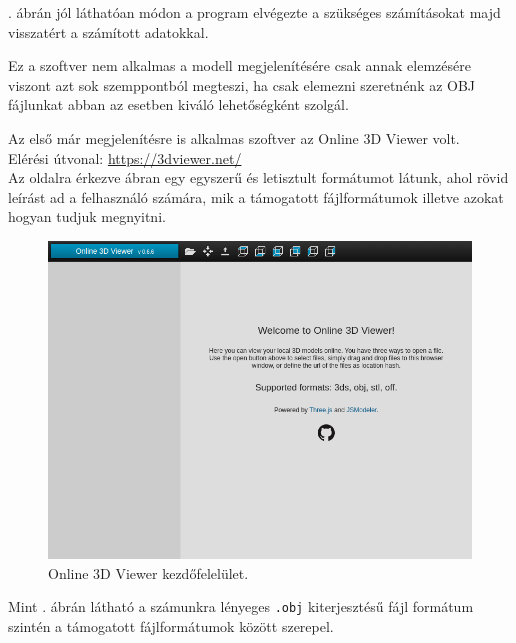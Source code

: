 . ábrán jól láthatóan módon a program elvégezte a szükséges számításokat majd visszatért a számított adatokkal.

Ez a szoftver nem alkalmas a modell megjelenítésére csak annak elemzésére viszont azt sok szemppontból megteszi, ha csak elemezni szeretnénk az OBJ fájlunkat abban az esetben kiváló lehetőségként szolgál.
\newpage
{}

Az első már megjelenítésre is alkalmas szoftver az Online 3D Viewer volt.\cite{online2014viktor}\\
Elérési útvonal: \url{https://3dviewer.net/}\\

Az oldalra érkezve  ábran egy egyszerű és letisztult formátumot látunk, ahol rövid leírást ad a felhasználó számára, mik a támogatott fájlformátumok illetve azokat hogyan tudjuk megnyitni. 
\bigskip
\begin{figure}[h]
\centering
\includegraphics[width=\textwidth]{images/Model_Viewer.png}
\caption{Online 3D Viewer kezdőfelelület.}
\label{fig:model_viewer1}
\end{figure}
\bigskip

Mint . ábrán látható a számunkra lényeges \texttt{.obj} kiterjesztésű fájl formátum szintén a támogatott fájlformátumok között szerepel.


